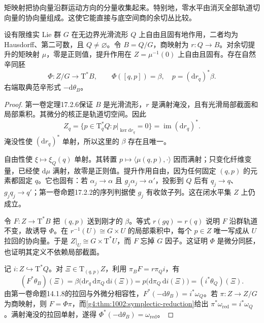 矩映射把协向量沿群运动方向的分量收集起来。特别地，零水平由消灭全部轨道切向量的协向量组成。这使它能直接与底空间商的余切丛比较。

\begin{theorem}\label{g4:thm:1003:cotangent-reduction}
	设有限维实 Lie 群 \(G\) 在无边界光滑流形 \(Q\) 上自由且固有地作用，二者均为 Hausdorff、第二可数，且 \(Q\ne\varnothing\)。令 \(B=Q/G\)，商映射为 \(r:Q\to B\)。对余切提升的矩映射 \(\mu\)，零是正则值，提升作用在 \(Z=\mu^{-1}(0)\) 上自由且固有。存在自然辛同胚
	\begin{equation}\label{g4:eq:1003:cotangent-reduction}
		\Phi:Z/G\longrightarrow\mathrm{T}^*B,
		\qquad
		\Phi([q,p])=\beta,\quad p=(\mathrm{d}r_q)^*\beta.
	\end{equation}
	右端取典范辛形式 \(-\mathrm{d}\theta_B\)。
\end{theorem}
\begin{proof}
	第一卷定理17.2.6保证 \(B\) 是光滑流形，\(r\) 是满射淹没，且有光滑局部截面和局部乘积。其微分的核正是轨道切空间。因此
	\[
		Z_q=\{p\in\mathrm{T}_q^*Q:p|_{\ker\mathrm{d}r_q}=0\}
		=\operatorname{im}(\mathrm{d}r_q)^*.
	\]
	淹没性使 \((\mathrm{d}r_q)^*\) 单射，所以这里的 \(\beta\) 存在且唯一。

	自由性使 \(\xi\mapsto\xi_Q(q)\) 单射。其转置
	\(p\mapsto\langle\mu(q,p),\cdot\rangle\) 因而满射；只变化纤维变量，已经使 \(\mathrm{d}\mu\) 满射，故零是正则值。提升作用自由，因为任何固定 \((q,p)\) 的元素都固定 \(q\)。它也固有：若 \(\alpha_j\to\alpha\) 且 \(g_j\alpha_j\to\alpha'\)，投影到 \(Q\) 后有 \(q_j\to q\)、\(g_jq_j\to q'\)；第一卷命题17.2.2的序列判据使 \(g_j\) 有收敛子列。这在闭水平集 \(Z\) 上仍成立。

	令 \(F:Z\to\mathrm{T}^*B\) 把 \((q,p)\) 送到刚才的 \(\beta\)。等式 \(r(gq)=r(q)\) 说明 \(F\) 沿群轨道不变，故诱导 \(\Phi\)。在 \(r^{-1}(U)\cong G\times U\) 的局部乘积中，每个 \(p\in Z\) 唯一写成从 \(U\) 拉回的协向量。于是 \(Z|_U\cong G\times\mathrm{T}^*U\)，而 \(F\) 忘掉 \(G\) 因子。这证明 \(\Phi\) 是微分同胚，也证明其定义不依赖局部截面。

	记 \(i:Z\hookrightarrow\mathrm{T}^*Q\)。对 \(\Xi\in\mathrm{T}_{(q,p)}Z\)，利用 \(\pi_BF=r\pi_Qi\)，有
	\[
		(F^*\theta_B)(\Xi)
		=\beta\bigl(\mathrm{d}r_q\,\mathrm{d}\pi_Q\,\mathrm{d}i(\Xi)\bigr)
		=p\bigl(\mathrm{d}\pi_Q\,\mathrm{d}i(\Xi)\bigr)
		=(i^*\theta_Q)(\Xi).
	\]
	由第一卷命题14.1.8的拉回与外微分相容性，\(F^*(-\mathrm{d}\theta_B)=i^*\omega_Q\)。若 \(\pi:Z\to Z/G\) 为商映射，则 \(F=\Phi\pi\)，而\cref{g4:thm:1002:symplectic-reduction}给出 \(\pi^*\omega_{\mathrm{red}}=i^*\omega_Q\)。满射淹没的拉回单射，遂得 \(\Phi^*(-\mathrm{d}\theta_B)=\omega_{\mathrm{red}}\)。
\end{proof}

